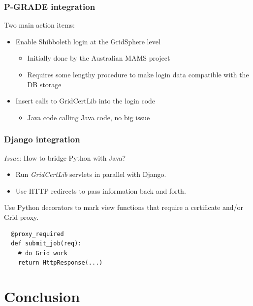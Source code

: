 \documentclass{beamer}
\newcommand{\+}{\vspace{1em}}
\begin{document}
\begin{frame}[label=pgrade]
  \frametitle{P-GRADE integration}

  Two main action items:
  \begin{itemize}
  \item Enable Shibboleth login at the GridSphere level
    \begin{itemize}
    \item Initially done by the Australian MAMS project
    \item Requires some lengthy procedure to make login data
      compatible with the DB storage
    \end{itemize}
  \item Insert calls to GridCertLib into the login code
    \begin{itemize}
    \item Java code calling Java code, no big issue
    \end{itemize}
  \end{itemize}

  \hyperlink{more-pgrade}{}
\end{frame}


\begin{frame}[fragile]
  \frametitle{Django integration}

  \emph{Issue:} How to bridge Python with Java?
  \begin{itemize}
  \item Run \emph{GridCertLib} servlets in parallel with Django.
  \item Use HTTP redirects to pass information back and forth.
  \end{itemize}

  \+
  Use Python decorators to mark view functions that require a
  certificate and/or Grid proxy.
\begin{verbatim}
  @proxy_required
  def submit_job(req):
    # do Grid work
    return HttpResponse(...)
\end{verbatim}

\end{frame}


\section{Conclusion}
\label{sec:conclusion}
\end{document}
